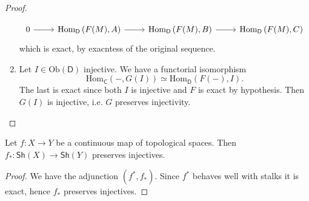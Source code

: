 \documentclass[../Main]{subfiles}
\begin{document}
\begin{proof}
\begin{enumerate}
\begin{equation}
	       \begin{tikzcd}
		       0 \arrow[r, "", rightarrow] &
		       \mathrm{Hom}_{\mathsf{D}} \left( F(M), A \right) \arrow[r, "", rightarrow] &
		       \mathrm{Hom}_{\mathsf{D}} \left( F(M), B \right) \arrow[r, "", rightarrow] &
		       \mathrm{Hom}_{\mathsf{D}} \left( F(M), C \right)
	       \end{tikzcd}
	       \end{equation} 
	       which is exact, by exacntess of the original sequence.
       \item Let $I \in \mathrm{Ob} \left(\mathsf{D}\right)$ injective.
	       We have a functorial isomorphism
	       \begin{equation}
		       \mathrm{Hom}_{\mathsf{C}} \left( -, G(I) \right) \simeq
		       \mathrm{Hom}_{\mathsf{D}} \left( F(-), I \right)
	       .\end{equation} 
	       The last is exact since both $I$ is injective and $F$ is exact by hypothesis.
	       Then $G(I)$ is injective, i.e. $G$ preserves injectivity.\qedhere
\end{enumerate}
\end{proof}

\begin{cor}
	Let $f\colon X \to Y$ be a continuous map of topological spaces.
	Then $f_*\colon \mathsf{Sh}(X) \to \mathsf{Sh}\left(Y\right)$
	preserves injectives.
\end{cor} 
\begin{proof}
	We have the adjunction $\left( f^*, f_* \right)$.
	Since $f^*$ behaves well with stalks it is exact, hence $f_*$
	preserves injectives.
\end{proof}
\end{document}
